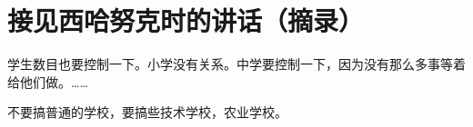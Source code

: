 \section[接见西哈努克时的讲话（摘录）（一九五八年八月十五日）]{接见西哈努克时的讲话（摘录）}


学生数目也要控制一下。小学没有关系。中学要控制一下，因为没有那么多事等着给他们做。……

不要搞普通的学校，要搞些技术学校，农业学校。


